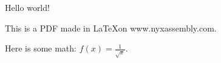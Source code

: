 \documentclass{article}
\begin{document}
Hello world!

This is a PDF made in \LaTeX on www.nyxassembly.com.

Here is some math: $f(x)=\frac{1}{\sqrt{x}}$.
\end{document}
